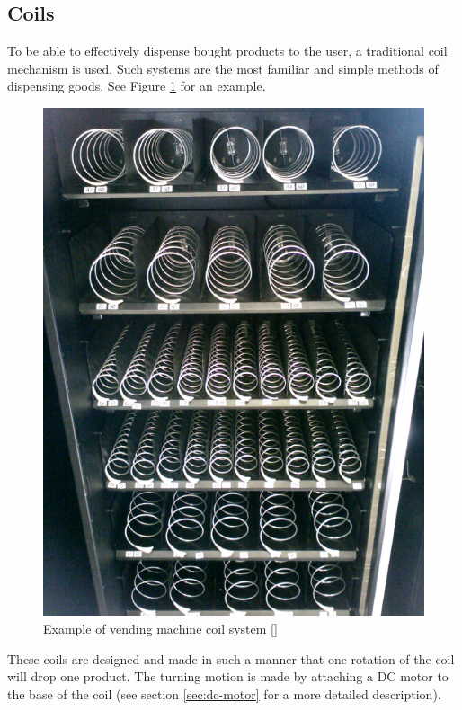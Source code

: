 \subsection{Coils}

To be able to effectively dispense bought products to the user, a traditional coil mechanism is
used. Such systems are the most familiar and simple methods of dispensing goods. See Figure
\ref{fig:vm-coils} for an example.

\begin{figure}[h]
\centering
\includegraphics[scale=0.2]{vm_coils.eps}
\caption{Example of vending machine coil system [\cite{website:arduino-specs}]}
\label{fig:vm-coils}
\end{figure}

These coils are designed and made in such a manner that one rotation of the coil will drop one
product. The turning motion is made by attaching a DC motor to the base of the coil (see
section \ref{sec:dc-motor} for a more detailed description).

